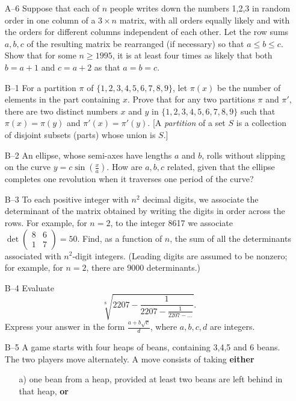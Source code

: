 \documentclass[amssymb,twocolumn,pra,10pt,aps]{revtex4-1}
\begin{document}
\begin{itemize}
\item[A--6] Suppose that each of $n$ people writes down the numbers
1,2,3 in random order in one column of a $3 \times n$ matrix, with
all orders equally likely and with the orders for different columns
independent of each other. Let the row sums $a,b,c$ of the resulting
matrix be rearranged (if necessary) so that $a \leq b \leq c$. Show
that for some $n \geq 1995$, it is at least four times as likely that
both $b=a+1$ and $c=a+2$ as that $a=b=c$.

\item[B--1]  For a partition $\pi$ of $\{1, 2, 3, 4, 5, 6, 7, 8, 9\}$,
let $\pi(x)$ be the number of elements in the part containing $x$.
Prove that for any two partitions $\pi$ and $\pi'$, there are two
distinct numbers $x$ and $y$ in $\{1, 2, 3, 4, 5, 6, 7, 8, 9\}$
such that $\pi(x) = \pi(y)$ and $\pi'(x) = \pi'(y)$. [A {\em
partition} of a set $S$ is a collection of disjoint subsets (parts)
whose union is $S$.]

\item[B--2] An ellipse, whose semi-axes have lengths $a$ and $b$,
rolls without slipping on the curve $y = c \sin \left( \frac{x}{a}
\right)$. How are $a,b,c$ related, given that the ellipse completes
one revolution when it traverses one period of the curve?

\item[B--3] To each positive integer with $n^{2}$ decimal digits, we
associate the determinant of the matrix obtained by writing the
digits in order across the rows. For example, for $n=2$, to the
integer 8617 we associate $\det \left(
 \begin{array}{cc} 8 & 6 \\
1 & 7 \end{array} \right) = 50$. Find, as a function of $n$, the
sum of all the determinants associated with $n^{2}$-digit
integers. (Leading digits are assumed to be nonzero; for example,
for $n=2$, there are 9000 determinants.)

\item[B--4] Evaluate
\[
\sqrt[8]{2207 - \frac{1}{2207-\frac{1}{2207-\dots}}}.
\]
Express your answer in the form $\frac{a+b\sqrt{c}}{d}$, where
$a,b,c,d$ are integers.

\item[B--5] A game starts with four heaps of beans, containing 3,4,5
and 6 beans. The two players move alternately. A move consists of
taking \textbf{either}
\begin{itemize}
\item[a)] one bean from a heap, provided at least two beans are
left behind in that heap, \textbf{or}


\end{itemize}
\end{itemize}
\end{document}
